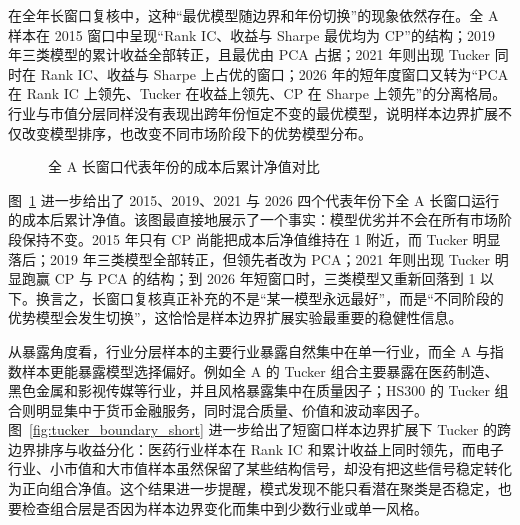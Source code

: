 在全年长窗口复核中，这种“最优模型随边界和年份切换”的现象依然存在。全 A 样本在 2015 窗口中呈现“Rank IC、收益与 Sharpe 最优均为 CP”的结构；2019 年三类模型的累计收益全部转正，且最优由 PCA 占据；2021 年则出现 Tucker 同时在 Rank IC、收益与 Sharpe 上占优的窗口；2026 年的短年度窗口又转为“PCA 在 Rank IC 上领先、Tucker 在收益上领先、CP 在 Sharpe 上领先”的分离格局。行业与市值分层同样没有表现出跨年份恒定不变的最优模型，说明样本边界扩展不仅改变模型排序，也改变不同市场阶段下的优势模型分布。

\begin{figure}[!t]
\centering
{}
\caption{全 A 长窗口代表年份的成本后累计净值对比}
\label{fig:all_a_long_window_cost}
\end{figure}

图~\ref{fig:all_a_long_window_cost} 进一步给出了 2015、2019、2021 与 2026 四个代表年份下全 A 长窗口运行的成本后累计净值。该图最直接地展示了一个事实：模型优劣并不会在所有市场阶段保持不变。2015 年只有 CP 尚能把成本后净值维持在 1 附近，而 Tucker 明显落后；2019 年三类模型全部转正，但领先者改为 PCA；2021 年则出现 Tucker 明显跑赢 CP 与 PCA 的结构；到 2026 年短窗口时，三类模型又重新回落到 1 以下。换言之，长窗口复核真正补充的不是“某一模型永远最好”，而是“不同阶段的优势模型会发生切换”，这恰恰是样本边界扩展实验最重要的稳健性信息。

从暴露角度看，行业分层样本的主要行业暴露自然集中在单一行业，而全 A 与指数样本更能暴露模型选择偏好。例如全 A 的 Tucker 组合主要暴露在医药制造、黑色金属和影视传媒等行业，并且风格暴露集中在质量因子；HS300 的 Tucker 组合则明显集中于货币金融服务，同时混合质量、价值和波动率因子。图~\ref{fig:tucker_boundary_short} 进一步给出了短窗口样本边界扩展下 Tucker 的跨边界排序与收益分化：医药行业样本在 Rank IC 和累计收益上同时领先，而电子行业、小市值和大市值样本虽然保留了某些结构信号，却没有把这些信号稳定转化为正向组合净值。这个结果进一步提醒，模式发现不能只看潜在聚类是否稳定，也要检查组合层是否因为样本边界变化而集中到少数行业或单一风格。

